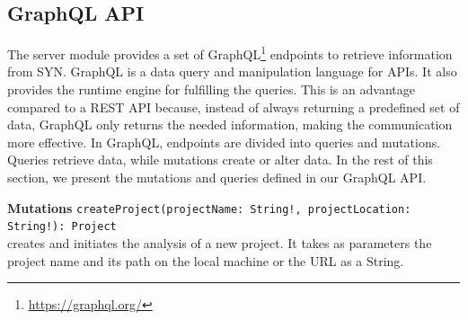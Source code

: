 \subsection*{GraphQL API} 
The server module provides a set of GraphQL\footnote{\url{https://graphql.org/}} endpoints to retrieve information from SYN. 
GraphQL is a data query and manipulation language for APIs. It also provides the runtime engine for fulfilling the queries.
This is an advantage compared to a REST API because, instead of always returning a predefined set of data, GraphQL only returns the needed information, making the communication more effective. 
In GraphQL, endpoints are divided into queries and mutations. Queries retrieve data, while mutations create or alter data. In the rest of this section, we present the mutations and queries defined in our GraphQL API.


\textbf{Mutations}
\texttt{createProject(projectName: String!, projectLocation: String!): Project} \\
creates and initiates the analysis of a new project.
It takes as parameters the project name and its path on the local machine or the URL as a String. 

